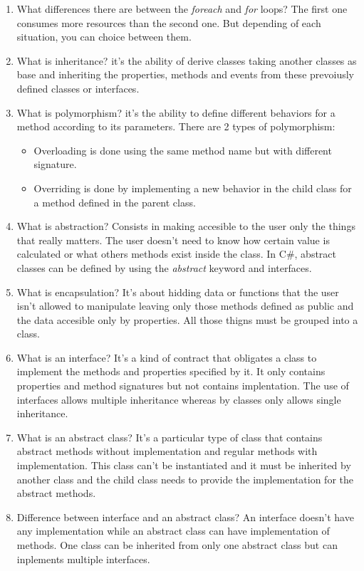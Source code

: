 \begin{multicols}{2}
\begin{enumerate}
\item What differences there are between the \emph{foreach} and \emph{for} loops? The first one consumes more resources than the second one. But depending of each situation, you can choice between them.
\item What is inheritance? it's the ability of derive classes taking another classes as base and inheriting the properties, methods and events from these prevoiusly defined classes or interfaces.
\item What is polymorphism? it's the ability to define different behaviors for a method according to its parameters. There are 2 types of polymorphism:
\begin{itemize}
\item Overloading is done using the same method name but with different signature.
\item Overriding is done by implementing a new behavior in the child class for a method defined in the parent class.
\end{itemize}
\item What is abstraction? Consists in making accesible to the user only the things that really matters. The user doesn't need to know how certain value is calculated or what others methods exist inside the class. In C\#, abstract classes can be defined by using the \emph{abstract} keyword and interfaces.
\item What is encapsulation? It's about hidding data or functions that the user isn't allowed to manipulate leaving only those methods defined as public and the data accesible only by properties. All those thigns must be grouped into a class.
\item What is an interface? It's a kind of contract that obligates a class to implement the methods and properties specified by it. It only contains properties and method signatures but not contains implentation. The use of interfaces allows multiple inheritance whereas by classes only allows single inheritance.
\item What is an abstract class? It's a particular type of class that contains abstract methods without implementation and regular methods with implementation. This class can't be instantiated and it must be inherited by another class and the child class needs to provide the implementation for the abstract methods.
\item Difference between interface and an abstract class? An interface doesn't have any implementation while an abstract class can have implementation of methods. One class can be inherited from only one abstract class but can inplements multiple interfaces.

\end{enumerate}
\end{multicols}
